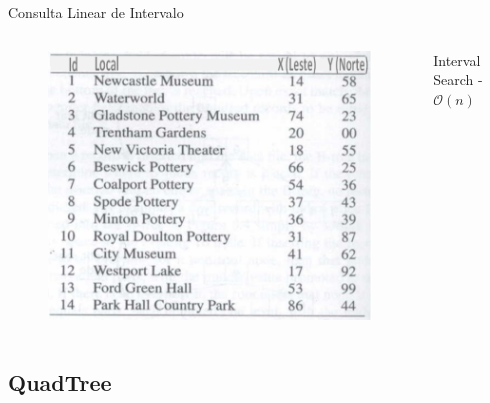\documentclass[red, tikz, aspectratio=169, xcolor=dvipsnames]{beamer}
\begin{document}
		\begin{frame}[fragile]{Consulta Linear de Intervalo}
			\begin{columns}
				\begin{column}{0.44\textwidth}
					\begin{figure}
						\centering
						\includegraphics[width=1\textwidth]{img/address.png}
					\end{figure}
				\end{column}
				\begin{column}{0.48\textwidth}
					\begin{algorithm2e}[H]
						\caption{Interval Search - $\mathcal{O}(n)$} 
					\end{algorithm2e}
				\end{column}
			\end{columns}
		\end{frame}

	
	\subsection{QuadTree}	
	
\end{document}
